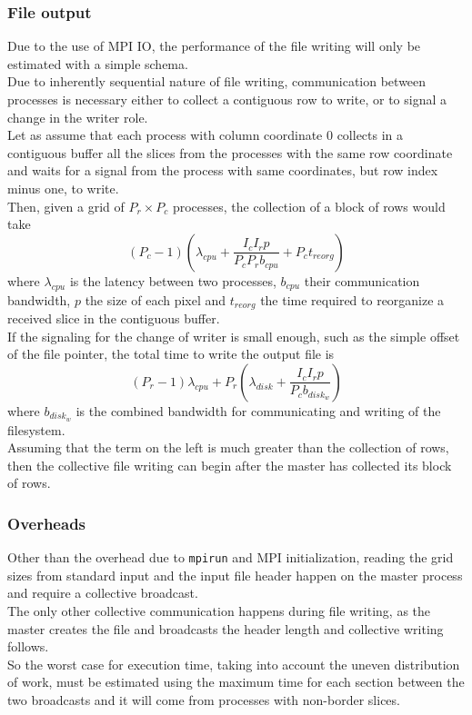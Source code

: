 \documentclass[a4paper, 11pt]{article}
\begin{document}
\subsubsection{File output}
Due to the use of MPI IO, the performance of the file writing will only be estimated with a simple schema.\\
Due to inherently sequential nature of file writing, communication between processes is necessary either to collect a contiguous row to write, or to signal a change in the writer role.\\
Let as assume that each process with column coordinate 0 collects in a contiguous buffer all the slices from the processes with the same row coordinate and waits for a signal from the process with same coordinates, but row index minus one, to write.\\
Then, given a grid of $P_r \times P_c$ processes, the collection of a block of rows would take
$$(P_c-1) \left(\lambda_{cpu} + \frac{I_c I_r p}{P_c P_r b_{cpu}} + P_c t_{reorg} \right)$$
where $\lambda_{cpu}$ is the latency between two processes, $b_{cpu}$ their communication bandwidth, $p$ the size of each pixel and $t_{reorg}$ the time required to reorganize a received slice in the contiguous buffer.\\
If the signaling for the change of writer is small enough, such as the simple offset of the file pointer, the total time to write the output file is
$$(P_r-1)\lambda_{cpu} + P_r \left(\lambda_{disk} + \frac{I_c I_r p}{P_c b_{disk_w}} \right)$$
where $b_{disk_w}$ is the combined bandwidth for communicating and writing of the filesystem.\\
Assuming that the term on the left is much greater than the collection of rows, then the collective file writing can begin after the master has collected its block of rows.
\subsubsection{Overheads}
Other than the overhead due to \texttt{mpirun} and MPI initialization, reading the grid sizes from standard input and the input file header happen on the master process and require a collective broadcast.\\
The only other collective communication happens during file writing, as the master creates the file and broadcasts the header length and collective writing follows.\\
So the worst case for execution time, taking into account the uneven distribution of work, must be estimated using the maximum time for each section between the two broadcasts and it will come from processes with non-border slices.\\
\end{document}
